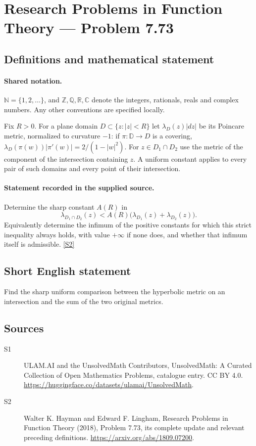 \documentclass[11pt]{article}
\newcommand{\sref}[2]{\hyperlink{source:#1:#2}{[S#2]}}
\begin{document}
\section{Research Problems in Function Theory — Problem 7.73}\label{statement}

\subsection{Definitions and mathematical statement}

\paragraph{Shared notation.}$\mathbb N=\{1,2,\ldots\}$, and $\mathbb Z,\mathbb Q,\mathbb R,\mathbb C$ denote the integers, rationals, reals and complex numbers. Any other conventions are specified locally.


Fix $R>0$. For a plane domain $D\subset\{z:|z|<R\}$ let $\lambda_D(z)|dz|$ be its Poincare metric, normalized to curvature $-1$: if $\pi:\mathbb D\to D$ is a covering, $\lambda_D(\pi(w))|\pi'(w)|=2/(1-|w|^2)$. For $z\in D_1\cap D_2$ use the metric of the component of the intersection containing $z$. A uniform constant applies to every pair of such domains and every point of their intersection.
\paragraph{Statement recorded in the supplied source.}
Determine the sharp constant $A(R)$ in
\[\lambda_{D_1\cap D_2}(z)<A(R)
\big(\lambda_{D_1}(z)+\lambda_{D_2}(z)\big).
\]
Equivalently determine the infimum of the positive constants for which this strict inequality always holds, with value $+\infty$ if none does, and whether that infimum itself is admissible. \sref{statement}{2}
\subsection{Short English statement}
Find the sharp uniform comparison between the hyperbolic metric on an intersection and the sum of the two original metrics.
\subsection{Sources}
\begin{description}
\item[\hypertarget{source:statement:1}{S1}] ULAM.AI and the UnsolvedMath Contributors, UnsolvedMath: A Curated Collection of Open Mathematics Problems, catalogue entry. CC BY 4.0. \url{https://huggingface.co/datasets/ulamai/UnsolvedMath}.
\item[\hypertarget{source:statement:2}{S2}] Walter K. Hayman and Edward F. Lingham, Research Problems in Function Theory (2018), Problem 7.73, its complete update and relevant preceding definitions. \url{https://arxiv.org/abs/1809.07200}.
\end{description}
\label{end:statement}
\end{document}
